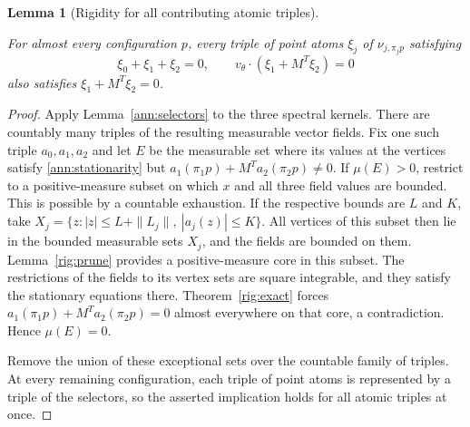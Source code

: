 \documentclass[11pt]{amsart}
\newtheorem{lemma}[theorem]{Lemma}
\theoremstyle{definition}
\theoremstyle{remark}
\numberwithin{equation}{section}
\providecommand{\lean}[1]{}
\providecommand{\leanok}{}
\begin{document}
\begin{lemma}[Rigidity for all contributing atomic triples]
\label{ann:atomic-rigidity}
\lean{Auto.ann_atomic_rigidity}
\leanok
For almost every configuration $p$, every triple of point atoms
$\xi_j$ of $\nu_{j,\pi_jp}$ satisfying
\begin{equation}\label{ann:stationarity}
 \xi_0+\xi_1+\xi_2=0,\qquad
 v_\theta\cdot(\xi_1+M^T\xi_2)=0
\end{equation}
also satisfies $\xi_1+M^T\xi_2=0$.
\end{lemma}
\begin{proof}
Apply Lemma~\ref{ann:selectors} to the three spectral kernels.
There are countably many triples of the resulting measurable
vector fields. Fix one such triple $a_0,a_1,a_2$ and let $E$ be
the measurable set where its values at the vertices satisfy
\eqref{ann:stationarity} but
$a_1(\pi_1p)+M^Ta_2(\pi_2p)\ne0$.
If $\mu(E)>0$, restrict to a positive-measure subset on which
$x$ and all three field values are bounded. This is possible by
a countable exhaustion. If the respective bounds are $L$ and $K$,
take $X_j=\{z:|z|\le L+\|L_j\|,\ |a_j(z)|\le K\}$.
All vertices of this subset then lie in the bounded measurable sets
$X_j$, and the fields are bounded on them. Lemma~\ref{rig:prune}
provides a positive-measure core in this subset. The restrictions
of the fields to its vertex sets are square integrable, and they
satisfy the stationary equations there. Theorem~\ref{rig:exact}
forces $a_1(\pi_1p)+M^Ta_2(\pi_2p)=0$ almost everywhere on that
core, a contradiction. Hence $\mu(E)=0$.

Remove the union of these exceptional sets over the countable
family of triples. At every remaining configuration, each triple
of point atoms is represented by a triple of the selectors, so
the asserted implication holds for all atomic triples at once.
\end{proof}
\end{document}
